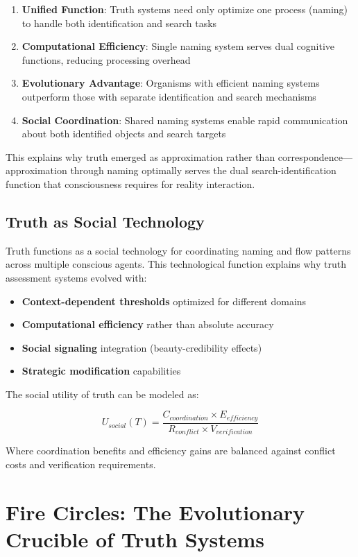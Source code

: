 \documentclass[12pt]{article}
\begin{document}
\begin{enumerate}
\item \textbf{Unified Function}: Truth systems need only optimize one process (naming) to handle both identification and search tasks
\item \textbf{Computational Efficiency}: Single naming system serves dual cognitive functions, reducing processing overhead
\item \textbf{Evolutionary Advantage}: Organisms with efficient naming systems outperform those with separate identification and search mechanisms
\item \textbf{Social Coordination}: Shared naming systems enable rapid communication about both identified objects and search targets
\end{enumerate}

This explains why truth emerged as approximation rather than correspondence—approximation through naming optimally serves the dual search-identification function that consciousness requires for reality interaction.

\subsection{Truth as Social Technology}

Truth functions as a social technology for coordinating naming and flow patterns across multiple conscious agents. This technological function explains why truth assessment systems evolved with:

\begin{itemize}
\item \textbf{Context-dependent thresholds} optimized for different domains
\item \textbf{Computational efficiency} rather than absolute accuracy
\item \textbf{Social signaling} integration (beauty-credibility effects)
\item \textbf{Strategic modification} capabilities
\end{itemize}

The social utility of truth can be modeled as:

$$U_{social}(T) = \frac{C_{coordination} \times E_{efficiency}}{R_{conflict} \times V_{verification}}$$

Where coordination benefits and efficiency gains are balanced against conflict costs and verification requirements.

\section{Fire Circles: The Evolutionary Crucible of Truth Systems}
\end{document}
